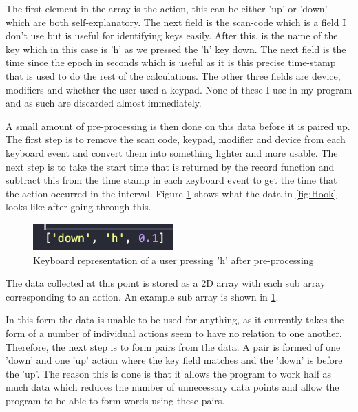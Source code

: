 \documentclass[10pt,a4paper]{report}
\begin{document}
The first element in the array is the action, this can be either 'up' or 'down' which are both self-explanatory. The next field is the scan-code which is a field I don't use but is useful for identifying keys easily. After this, is the name of the key which in this case is 'h' as we pressed the 'h' key down. The next field is the time since the epoch in seconds which is useful as it is this precise time-stamp that is used to do the rest of the calculations. The other three fields are device, modifiers and whether the user used a keypad. None of these I use in my program and as such are discarded almost immediately.

A small amount of pre-processing is then done on this data before it is paired up. The first step is to remove the scan code, keypad, modifier and device from each keyboard event and convert them into something lighter and more usable. The next step is to take the start time that is returned by the record function and subtract this from the time stamp in each keyboard event to get the time that the action occurred in the interval. Figure \ref{fig:preproc} shows what the data in \ref{fig:Hook} looks like after going through this.

\begin{figure}
	\begin{center}
		\includegraphics[width=0.48\textwidth]{KeyboardEventPreProc}
	\end{center}
	\caption{Keyboard representation of a user pressing 'h' after pre-processing}
	\label{fig:preproc}
\end{figure}

The data collected at this point is stored as a 2D array with each sub array corresponding to an action. An example sub array is shown in \ref{fig:preproc}.

In this form the data is unable to be used for anything, as it currently takes the form of a number of individual actions seem to have no relation to one another. Therefore, the next step is to form pairs from the data. A pair is formed of one 'down' and one 'up' action where the key field matches and the 'down' is before the 'up'. The reason this is done is that it allows the program to work half as much data which reduces the number of unnecessary data points and allow the program to be able to form words using these pairs.
\end{document}
